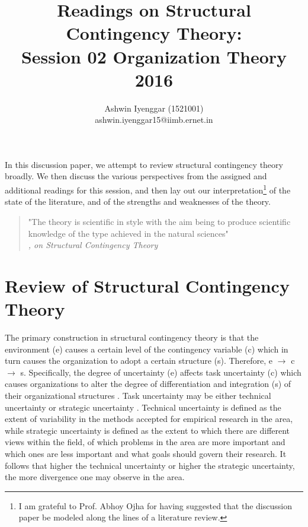 \documentclass[12pt]{article}
\begin{document}
\title{Readings on Structural Contingency Theory:\\  Session 02 Organization Theory 2016}
\author{Ashwin Iyenggar  (1521001) \\ ashwin.iyenggar15@iimb.ernet.in} 


\maketitle
\thispagestyle{empty}


\abstract
In this discussion paper, we attempt to review structural contingency theory broadly. We then discuss the various perspectives from the assigned and additional readings for this session, and then lay out our interpretation\footnote{I am grateful to Prof. Abhoy Ojha for having suggested that the discussion paper be modeled along the lines of a literature review. } of the state of the literature, and of the strengths and weaknesses of the theory.


 \begin{quotation}
"The theory is scientific in style with the aim being to produce scientific knowledge of the type achieved in the natural sciences" \\ 
\null\hfill \textit{\cite{Donaldson1996a}, on Structural Contingency Theory}
 \end{quotation}
 
\section{Review of Structural Contingency Theory}\label{S:Review}
The primary construction in structural contingency theory is that the environment (e) causes a certain level of the contingency variable (c) which in turn causes the organization to adopt a certain structure (s). Therefore, e $\rightarrow$ c $\rightarrow$ s. Specifically, the degree of uncertainty (e) affects task uncertainty (c) which causes organizations to alter the degree of differentiation and integration (s) of their organizational structures \citep{Lawrence1967}. Task uncertainty may be either technical uncertainty or strategic uncertainty \citep{Whitley1984a}. Technical uncertainty is defined as the extent of variability in the methods accepted for empirical research in the area, while strategic uncertainty is defined as the extent to which there  are different views within the field, of which problems in the area are more important and which ones are less important and what goals should govern their research. It follows that higher the technical uncertainty or higher the strategic uncertainty, the more divergence one may observe in the area.
\end{document}
